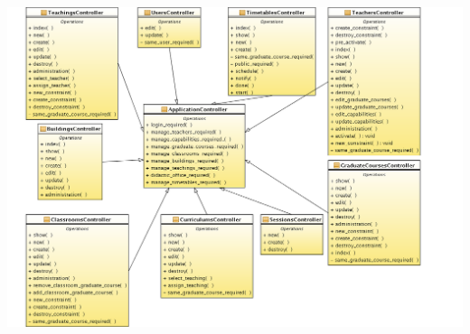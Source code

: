 \documentclass[11pt,a4paper]{article}
\begin{document}
\bigskip
\includegraphics[scale=0.34]{images/Controller_ClassDiagram.png}
\end{document}
